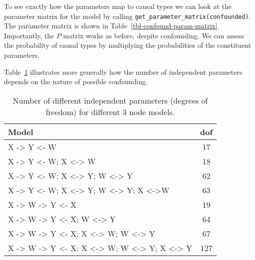 \documentclass[
  11pt,
  article]{jss}
\begin{document}
To see exactly how the parameters map to causal types we can look at the
parameter matrix for the model by calling
\texttt{get\_parameter\_matrix(confounded)}. The parameter matrix is
shown in Table~\ref{tbl-confound-param-matrix}. Importantly, the \(P\)
matrix works as before, despite confounding. We can assess the
probability of causal types by multiplying the probabilities of the
constituent parameters.

\hypertarget{tbl-confound-param-matrix}{}
\begin{table}
\caption{\label{tbl-confound-param-matrix}Parameter matrix for model with confounding. }\tabularnewline

\centering
{}
\end{table}

Table~\ref{tbl-dof} illustrates more generally how the number of
independent parameters depends on the nature of possible confounding.

\hypertarget{tbl-dof}{}
\begin{table}
\caption{\label{tbl-dof}Number of different independent parameters (degrees of freedom) for
different 3 node models. }\tabularnewline

\centering
\begin{tabular}{lc}
\toprule
Model & dof\\
\midrule
X -> Y <- W & 17\\
X -> Y <- W; X <-> W & 18\\
X -> Y <- W; X <-> Y; W <-> Y & 62\\
X -> Y <- W; X <-> Y; W <-> Y; X <->W & 63\\
X -> W -> Y <- X & 19\\
X -> W -> Y <- X; W <-> Y & 64\\
X -> W -> Y <- X; X <-> W; W <-> Y & 67\\
X -> W -> Y <- X; X <-> W; W <-> Y; X <-> Y & 127\\
\bottomrule
\end{tabular}
\end{table}
\end{document}
